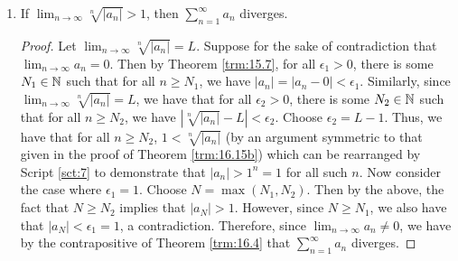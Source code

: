 \documentclass[../main.tex]{subfiles}
\begin{document}
\begin{theorem}
\begin{enumerate}[label={\textup{(}\alph*\textup{)}}]
\begin{proof}
            Let $\lim_{n\to\infty}\sqrt[n]{|a_n|}=L$. To prove that $\sum_{n=1}^\infty a_n$ converges, Theorem \ref{trm:16.13} tells us that that it will suffice to find a sequence $(c_n)$ of positive numbers such that $|a_n|\leq c_n$ for all $n\geq N_0$, where $N_0$ is some fixed integer, for which $\sum_{n=1}^\infty c_n$ converges. Since $L<1$ by hypothesis and $0<1$ by Corollary \ref{cly:7.27}, Theorem \ref{trm:5.2} asserts that there exists a point $x\in\R$ such that $\max(0,L)<x<1$. We now define $(c_n)$ by $c_n=x^n$ for all $n\in\N$. By Script \ref{sct:7} and the fact that $x\geq 0$, we know that $(c_n)$ is a sequence of positive numbers. Additionally, since $x-L>0$, Theorem \ref{trm:15.7} implies that there is some $N_0\in\N$ such that for all $n\geq N_0$, $|\sqrt[n]{|a_n|}-L|<x-L$. It follows by Script \ref{sct:7} that $|a_n|\leq x^n=c_n$ for all $n\geq N_0$. Lastly, since $-1<\max(0,L)<x<1$, we have by Theorem \ref{trm:16.7} that $\sum_{n=1}^\infty c_n$ converges, as desired.
        \end{proof}
        \item If $\lim_{n\to\infty}\sqrt[n]{|a_n|}>1$, then $\sum_{n=1}^\infty a_n$ diverges.
        \begin{proof}
            Let $\lim_{n\to\infty}\sqrt[n]{|a_n|}=L$. Suppose for the sake of contradiction that $\lim_{n\to\infty}a_n=0$. Then by Theorem \ref{trm:15.7}, for all $\epsilon_1>0$, there is some $N_1\in\mathbb{N}$ such that for all $n\geq N_1$, we have $|a_n|=|a_n-0|<\epsilon_1$. Similarly, since $\lim_{n\to\infty}\sqrt[n]{|a_n|}=L$, we have that for all $\epsilon_2>0$, there is some $N_2\in\mathbb{N}$ such that for all $n\geq N_2$, we have $|\sqrt[n]{|a_n|}-L|<\epsilon_2$. Choose $\epsilon_2=L-1$. Thus, we have that for all $n\geq N_2$, $1<\sqrt[n]{|a_n|}$ (by an argument symmetric to that given in the proof of Theorem \ref{trm:16.15b}) which can be rearranged by Script \ref{sct:7} to demonstrate that $|a_n|>1^n=1$ for all such $n$. Now consider the case where $\epsilon_1=1$. Choose $N=\max(N_1,N_2)$. Then by the above, the fact that $N\geq N_2$ implies that $|a_N|>1$. However, since $N\geq N_1$, we also have that $|a_N|<\epsilon_1=1$, a contradiction. Therefore, since $\lim_{n\to\infty}a_n\neq 0$, we have by the contrapositive of Theorem \ref{trm:16.4} that $\sum_{n=1}^\infty a_n$ diverges.
        \end{proof}
    \end{enumerate}
\end{theorem}
\end{document}

